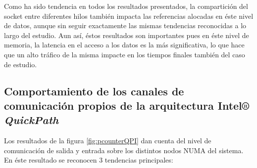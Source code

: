 Como ha sido tendencia en todos los resultados presentados, la compartición del socket entre diferentes hilos también impacta las referencias alocadas en éste nivel de datos, aunque sin seguir exactamente las mismas tendencias reconocidas a lo largo del estudio. Aun así, éstos resultados son importantes pues en éste nivel de memoria, la latencia en el acceso a los datos es la más significativa, lo que hace que un alto tráfico de la misma impacte en los tiempos finales también del caso de estudio.

\subsection{Comportamiento de los canales de comunicación propios de la arquitectura Intel® \emph{QuickPath}}

Los resultados de la figura \ref{fig:pcounterQPI} dan cuenta del nivel de comunicación de salida y entrada sobre los distintos nodos NUMA del sistema. En éste resultado se reconocen 3 tendencias principales:
